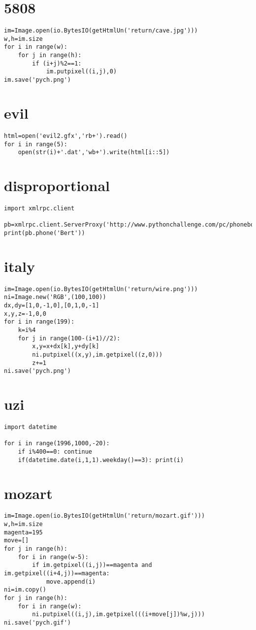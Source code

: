 \documentclass[onecolumn,a4paper,12pt]{article}
\begin{document}
\section{5808}
\begin{lstlisting}
im=Image.open(io.BytesIO(getHtmlUn('return/cave.jpg')))
w,h=im.size
for i in range(w):
    for j in range(h):
        if (i+j)%2==1:
            im.putpixel((i,j),0)
im.save('pych.png')
\end{lstlisting}

\section{evil}
\begin{lstlisting}
html=open('evil2.gfx','rb+').read()
for i in range(5):
    open(str(i)+'.dat','wb+').write(html[i::5])
\end{lstlisting}

\section{disproportional}
\begin{lstlisting}
import xmlrpc.client

pb=xmlrpc.client.ServerProxy('http://www.pythonchallenge.com/pc/phonebook.php')
print(pb.phone('Bert'))
\end{lstlisting}

\section{italy}
\begin{lstlisting}
im=Image.open(io.BytesIO(getHtmlUn('return/wire.png')))
ni=Image.new('RGB',(100,100))
dx,dy=[1,0,-1,0],[0,1,0,-1]
x,y,z=-1,0,0
for i in range(199):
    k=i%4
    for j in range(100-(i+1)//2):
        x,y=x+dx[k],y+dy[k]
        ni.putpixel((x,y),im.getpixel((z,0)))
        z+=1
ni.save('pych.png')
\end{lstlisting}

\section{uzi}
\begin{lstlisting}
import datetime

for i in range(1996,1000,-20):
    if i%400==0: continue
    if(datetime.date(i,1,1).weekday()==3): print(i)
\end{lstlisting}

\section{mozart}
\begin{lstlisting}
im=Image.open(io.BytesIO(getHtmlUn('return/mozart.gif')))
w,h=im.size
magenta=195
move=[]
for j in range(h):
    for i in range(w-5):
        if im.getpixel((i,j))==magenta and im.getpixel((i+4,j))==magenta:
            move.append(i)
ni=im.copy()
for j in range(h):
    for i in range(w):
        ni.putpixel((i,j),im.getpixel(((i+move[j])%w,j)))
ni.save('pych.gif')
\end{lstlisting}
\end{document}
